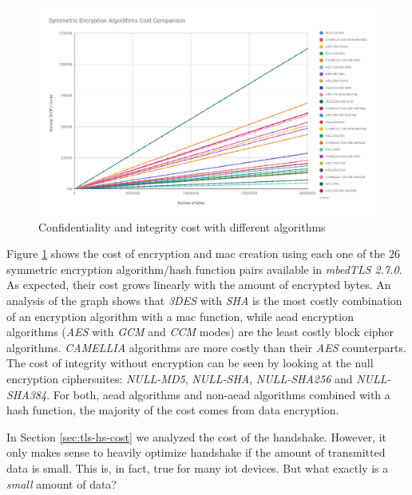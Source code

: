 \documentclass{llncs}
\begin{document}
\begin{figure}
  \centering
  \includegraphics[width=1.0\textwidth]{img/sym_algs_cc.png}
  \centering \caption{\label{fig:symm-encr-all} Confidentiality and integrity cost with different algorithms}
\end{figure}

Figure \ref{fig:symm-encr-all} shows the cost of encryption and \gls{mac} creation using each one of the $26$ symmetric encryption 
algorithm/hash function pairs available in \textit{mbedTLS 2.7.0}. As expected, their cost grows linearly with the amount of encrypted bytes.
An analysis of the graph shows that \textit{3DES} with \textit{SHA} is the most costly combination of an encryption algorithm with a \gls{mac} function, 
while \gls{aead} encryption algorithms 
(\textit{AES} with \textit{GCM} and \textit{CCM} modes) are the least costly block cipher algorithms. 
\textit{CAMELLIA} algorithms are more costly than their \textit{AES} counterparts.  The cost of integrity without encryption can be seen by looking at the null
encryption ciphersuites: \textit{NULL-MD5}, \textit{NULL-SHA}, \textit{NULL-SHA256} and \textit{NULL-SHA384}.
For both, \gls{aead} algorithms and non-\gls{aead} algorithms combined with a hash function, the majority of the cost comes from data encryption.

In Section \ref{sec:tls-hs-cost} we analyzed the cost of the handshake. However, it only makes sense to heavily optimize handshake
if the amount of transmitted data is small. This is, in fact, true for many \gls{iot} devices. But what exactly is a \textit{small} amount of data?
\end{document}

